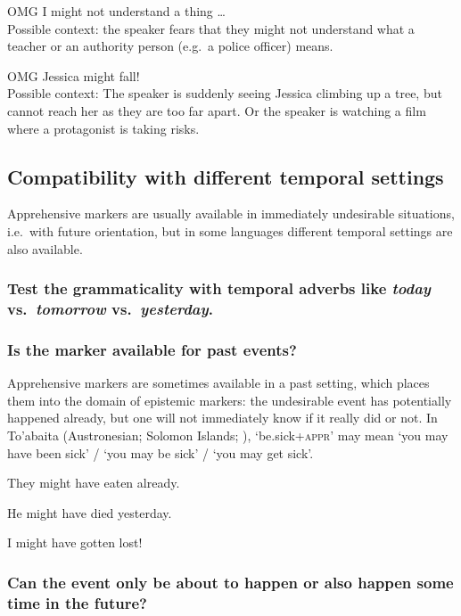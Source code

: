 \documentclass[output=paper,colorlinks,citecolor=brown]{langscibook}
\begin{document}
\ea \label{p21} {\op}OMG{\cp} I might not understand a thing \ldots \\
\textnormal{Possible context: the speaker fears that they might not understand what a teacher or an authority person (e.g.\ a police officer) means.}
\z

\ea \label{p22} {\op}OMG{\cp} Jessica might fall! \\
\textnormal{Possible context: The speaker is suddenly seeing Jessica climbing up a tree, but cannot reach her as they are too far apart. Or the speaker is watching a film where a protagonist is taking risks.}
\z


\subsection{Compatibility with different temporal settings}
\label{subsec:apprtemporal}

Apprehensive markers are usually available in immediately undesirable situations, i.e.\ with future orientation, but in some languages different temporal settings are also available.

\subsubsection{Test the grammaticality with temporal adverbs like \textit{today} vs.\ \textit{tomorrow} vs.\ \textit{yesterday}.}
\label{1.6.1}

\subsubsection{Is the marker available for past events?}
\label{1.6.2}

Apprehensive markers are sometimes available in a past setting, which places them into the domain of epistemic markers: the undesirable event has potentially happened already, but one will not immediately know if it really did or not. In To'abaita (Austronesian; Solomon Islands; \cite[296]{lichtenberk1995}), `be.sick+\textsc{appr}' may mean `you may have been sick' / `you may be sick' / `you may get sick'.

\ea \label{p23} They might have eaten already.
\z

\ea \label{p24} He might have died yesterday.
\z

\ea \label{p25} I might have gotten lost!
\z

\subsubsection{Can the event only be about to happen or also happen some time in the future?}
\label{1.6.3}
\end{document}
